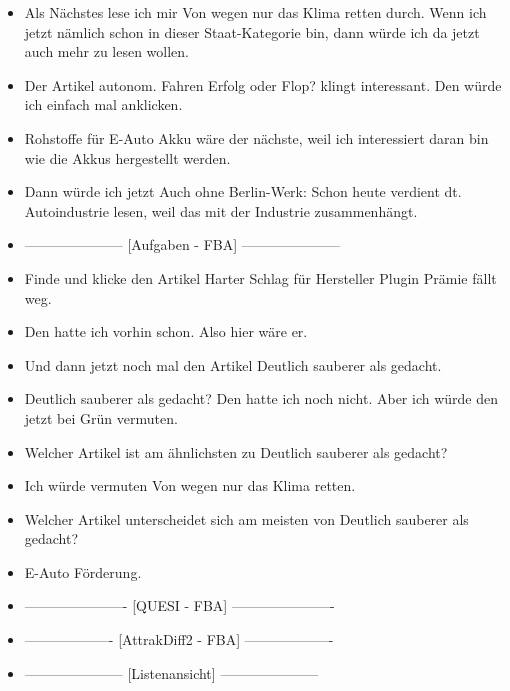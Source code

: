 {\begin{itemize}[]
            \item {} Als Nächstes lese ich mir \flqq Von wegen nur das Klima retten\frqq{} durch.
                  Wenn ich jetzt nämlich schon in dieser Staat-Kategorie bin, dann würde ich da jetzt auch mehr zu lesen wollen.
            \item {} Der Artikel \flqq autonom. Fahren Erfolg oder Flop?\frqq{} klingt interessant.
                  Den würde ich einfach mal anklicken.
            \item {} \flqq Rohstoffe für E-Auto Akku\frqq{} wäre der nächste, weil ich interessiert daran bin wie die Akkus hergestellt werden.
            \item {} Dann würde ich jetzt \flqq Auch ohne Berlin-Werk: Schon heute verdient dt. Autoindustrie\frqq{} lesen, weil das mit der Industrie zusammenhängt.
            \item {---------------------} [Aufgaben - FBA] {---------------------}
            \item {} Finde und klicke den Artikel \flqq Harter Schlag für Hersteller Plugin Prämie fällt weg\frqq{}.
            \item {} Den hatte ich vorhin schon. Also hier wäre er.
            \item {} Und dann jetzt noch mal den Artikel \flqq Deutlich sauberer als gedacht\frqq{}.
            \item {} \flqq Deutlich sauberer als gedacht\frqq{}?
                  Den hatte ich noch nicht.
                  Aber ich würde den jetzt bei Grün vermuten.
            \item {} Welcher Artikel ist am ähnlichsten zu \flqq Deutlich sauberer als gedacht\frqq{}?
            \item {} Ich würde vermuten \flqq Von wegen nur das Klima retten\frqq{}.
            \item {} Welcher Artikel unterscheidet sich am meisten von \flqq Deutlich sauberer als gedacht\frqq{}?
            \item {} \flqq E-Auto Förderung\frqq{}.
            \item {----------------------} [QUESI - FBA] {----------------------}
            \item {-------------------} [AttrakDiff2 - FBA] {-------------------}
            \item {---------------------} [Listenansicht] {---------------------}

\end{itemize}}

